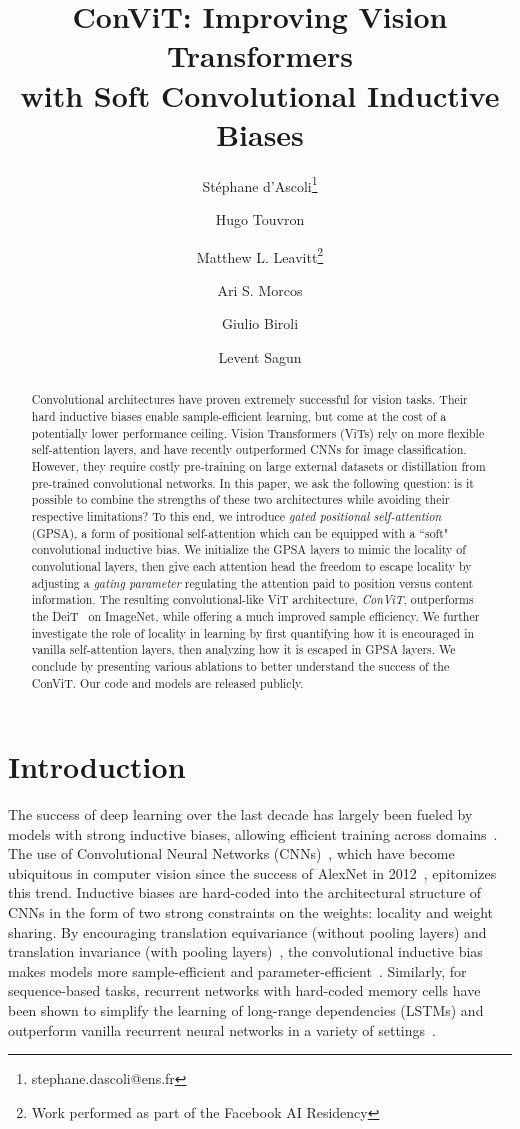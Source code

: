\documentclass[a4paper,11pt,twocolumn]{article}
\title{ConViT: Improving Vision Transformers \\with Soft Convolutional Inductive Biases}
\author[1,2]{St\'ephane d'Ascoli\thanks{stephane.dascoli@ens.fr}}
\author[1,3]{Hugo Touvron}
\author[1]{Matthew L. Leavitt\thanks{Work performed as part of the Facebook AI Residency}}
\author[1]{Ari S. Morcos}
\author[2]{Giulio Biroli}
\author[1]{Levent Sagun}
\affil[1]{Facebook AI Research}
\affil[2,3]{Laboratoire de Physique de l'\'{E}cole normale sup\'{e}rieure, ENS,
  Universit\'{e} PSL, CNRS, Universit\'{e} de Paris,  Paris, France\\}
\affil[3]{Sorbonne Université, Paris, France}
\date{}
\begin{document}
\maketitle
\begin{abstract}
Convolutional architectures have proven extremely successful for vision tasks. Their hard inductive biases enable sample-efficient learning, but come at the cost of a potentially lower performance ceiling. Vision Transformers (ViTs) rely on more flexible self-attention layers, and have recently outperformed CNNs for image classification. However, they require costly pre-training on large external datasets or distillation from pre-trained convolutional networks. In this paper, we ask the following question: is it possible to combine the strengths of these two architectures while avoiding their respective limitations? To this end, we introduce \emph{gated positional self-attention} (GPSA), a form of positional self-attention which can be equipped with a ``soft" convolutional inductive bias. We initialize the GPSA layers to mimic the locality of convolutional layers, then give each attention head the freedom to escape locality by adjusting a \emph{gating parameter} regulating the attention paid to position versus content information. The resulting convolutional-like ViT architecture, \textit{ConViT}, outperforms the DeiT~\cite{touvron2020training} on ImageNet, while offering a much improved sample efficiency.
We further investigate the role of locality in learning by first quantifying how it is encouraged in vanilla self-attention layers, then analyzing how it is escaped in GPSA layers. We conclude by presenting various ablations to better understand the success of the ConViT. Our code and models are released publicly.
\end{abstract} 
\section{Introduction}

The success of deep learning over the last decade has largely been fueled by models with strong inductive biases, allowing efficient training across domains~\cite{mitchell1980need,goodfellow_deep_2016}. The use of Convolutional Neural Networks (CNNs)~\cite{lecun1998gradient,lecun1989backpropagation}, which have become ubiquitous in computer vision since the success of AlexNet in 2012~\cite{krizhevsky2017imagenet}, epitomizes this trend. Inductive biases are hard-coded into the architectural structure of CNNs in the form of two strong constraints on the weights: locality and weight sharing. By encouraging translation equivariance (without pooling layers) and translation invariance (with pooling layers)~\cite{scherer_evaluation_2010,schmidhuber_deep_2015,goodfellow_deep_2016}, the convolutional inductive bias makes models more sample-efficient and parameter-efficient~\cite{simoncelli2001natural,ruderman1994statistics}. Similarly, for sequence-based tasks, recurrent networks with hard-coded memory cells have been shown to simplify the learning of long-range dependencies (LSTMs) and outperform vanilla recurrent neural networks in a variety of settings~\cite{gers1999learning,sundermeyer_lstm_2012,greff_lstm_2017}.
\end{document}
